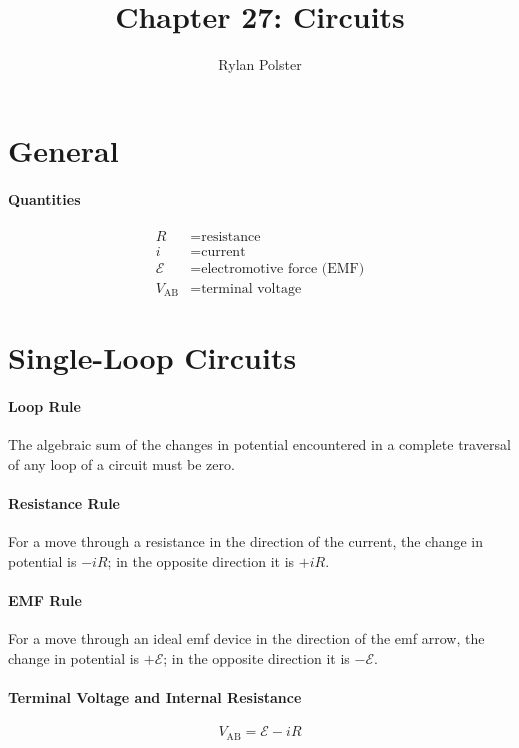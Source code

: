\documentclass{article}
\title{Chapter 27: Circuits}
\author{Rylan Polster}
\begin{document}
    \maketitle
    
    \section*{General}

        \paragraph{Quantities}
        \begin{align}
            R &= \text{resistance} \nonumber\\
            i &= \text{current} \nonumber\\
            \mathcal{E} &= \text{electromotive force (EMF)} \nonumber\\
            V_\text{AB} &= \text{terminal voltage} \nonumber
        \end{align}

    \section{Single-Loop Circuits}

        \paragraph{Loop Rule}
        The algebraic sum of the changes in potential encountered in a complete traversal of any loop of a circuit must be zero.

        \paragraph{Resistance Rule}
        For a move through a resistance in the direction of the current, the change in potential is $-iR$; in the opposite direction it is $+iR$.

        \paragraph{EMF Rule}
        For a move through an ideal emf device in the direction of the emf arrow, the change in potential is $+\mathcal{E}$; in the opposite direction it is $-\mathcal{E}$.

        \paragraph{Terminal Voltage and Internal Resistance}
        \begin{equation}
            V_\text{AB} = \mathcal{E} - i R
        \end{equation}
\end{document}
